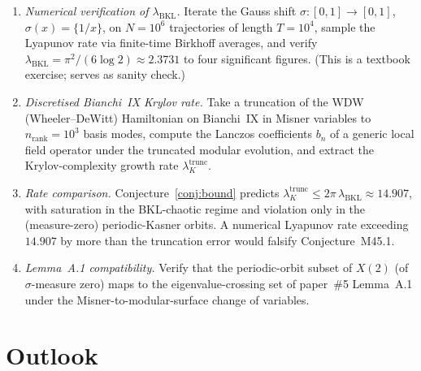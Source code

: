 \documentclass[12pt,a4paper]{article}
\begin{document}
\begin{enumerate}
\item[(F1)] \emph{Numerical verification of $\lambda_{\mathrm{BKL}}$.}
Iterate the Gauss shift $\sigma:[0,1]\to[0,1]$,
$\sigma(x)=\{1/x\}$, on $N=10^6$ trajectories of length $T=10^4$,
sample the Lyapunov rate via finite-time Birkhoff averages, and
verify $\lambda_{\mathrm{BKL}} = \pi^2/(6\log 2) \approx 2.3731$ to
four significant figures. (This is a textbook exercise; serves as
sanity check.)

\item[(F2)] \emph{Discretised Bianchi~IX Krylov rate.}
Take a truncation of the WDW (Wheeler--DeWitt) Hamiltonian on
Bianchi~IX in Misner variables to $n_{\mathrm{rank}}=10^3$ basis
modes, compute the Lanczos coefficients $b_n$ of a generic local
field operator under the truncated modular evolution, and extract the
Krylov-complexity growth rate $\lambda_K^{\mathrm{trunc}}$.

\item[(F3)] \emph{Rate comparison.}
Conjecture~\ref{conj:bound} predicts
$\lambda_K^{\mathrm{trunc}} \le 2\pi\,\lambda_{\mathrm{BKL}}
\approx 14.907$, with saturation in the BKL-chaotic regime and
violation only in the (measure-zero) periodic-Kasner orbits.
A numerical Lyapunov rate exceeding $14.907$ by more than the truncation
error would falsify Conjecture~M45.1.

\item[(F4)] \emph{Lemma~A.1 compatibility.}
Verify that the periodic-orbit subset of $X(2)$ (of $\sigma$-measure
zero) maps to the eigenvalue-crossing set of paper~\#5
Lemma~A.1 under the Misner-to-modular-surface change of variables.
\end{enumerate}

\section{Outlook}\label{sec:outlook}
\end{document}
